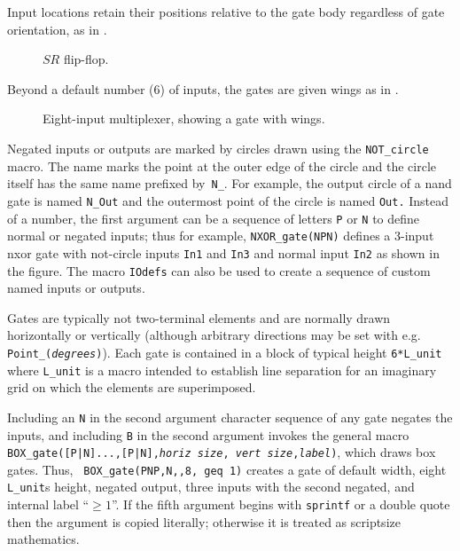 Input locations retain their positions relative to the gate body
regardless of gate orientation, as in .
\begin{figure}[H]
   \vspace*{-\baselineskip}
   \parbox{4.75in}{\small }%
   
   \vspace*{-\baselineskip}
   \caption{$SR$ flip-flop.}
   \label{FF}
   \end{figure}

\pagebreak
Beyond a default number (6) of inputs, the
gates are given wings as in .
\begin{figure}[H]
   
   \vspace*{-0.5\baselineskip}
   \caption{Eight-input multiplexer, showing a gate with wings.}
   \label{exVIII}
   \end{figure}

Negated inputs or outputs are marked by circles drawn using the
\verb|NOT_circle| macro.  The name marks the point at the outer edge of the
circle and the circle itself has the same name prefixed by~{\tt N\_}.
For example, the output circle of a nand gate is named
{\tt N\_Out} and the outermost point of the circle is named {\tt Out.}
Instead of a number, the first argument can be a sequence of letters {\tt P}
or {\tt N} to define normal or negated inputs; thus for example,
{\tt NXOR\_gate(NPN)} defines a 3-input nxor gate with not-circle
inputs {\tt In1} and {\tt In3} and normal input {\tt In2}
as shown in the figure.
The macro {\tt IOdefs} can also be used to create a sequence of custom
named inputs or outputs.

Gates are typically not two-terminal elements and are normally drawn
horizontally or vertically (although arbitrary directions may be set
with e.g. {\tt Point\_({\sl degrees})}).
Each gate is contained in a
block of typical height {\tt 6*L\_unit} where {\tt L\_unit} is a macro
intended to establish line separation for an imaginary grid on which
the elements are superimposed.

Including an \verb|N| in the second
argument character sequence of any gate negates the inputs, and including
\verb|B| in the second argument invokes the
general macro {\tt BOX\_gate([P|N]...,[P|N],{\sl horiz size},{\sl
vert size},{\sl label})}, which draws box gates.  Thus, {\tt
BOX\_gate(PNP,N,{},8, geq 1)} creates a gate of default width,
eight {\tt L\_unit}s height, negated output, three inputs with the
second negated, and internal label ``$\geq1$''.
If the fifth argument begins with {\tt sprintf} or a double quote then
the argument is copied literally; otherwise it is treated as scriptsize
mathematics.

